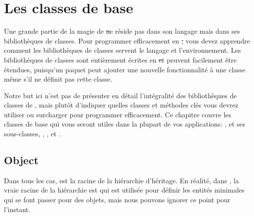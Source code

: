 \documentclass[a4paper,10pt,twoside]{book}
\begin{document}
	\renewcommand{\nnbb}[2]{} %
	\sloppy
\fi
\chapter{Les classes de base}
\label{cha:basic}
Une grande partie de la magie de \st ne r\'eside pas dans son langage mais dans ses biblioth\`eques de classes. Pour programmer efficacement en \st, vous devez apprendre comment les biblioth\`eques de classes servent le langage et l'environnement. Les biblioth\`eques de classes sont enti\`erement \'ecrites en \st et peuvent facilement \^etre \'etendues, puisqu'un paquet peut ajouter une nouvelle fonctionnalit\'e \`a une classe m\^eme s'il ne d\'efinit pas cette classe. 

Notre but ici n'est pas de pr\'esenter en d\'etail l'int\'egralit\'e des biblioth\`eques de classes de \sq, mais plut\^ot d'indiquer quelles classes et m\'ethodes cl\'es vous devrez utiliser ou surcharger pour programmer efficacement. Ce chapitre couvre les classes de base qui vous seront utiles dans la plupart de vos applications: ,  et ses sous-classes, , ,  et .


\section{Object}

Dans tous les cas,  est la racine de la hi\'erarchie d'h\'eritage. En r\'ealit\'e, dans \sq , la vraie racine de la hi\'erarchie est  qui est utilis\'ee pour d\'efinir les entit\'es minimales qui se font passer pour des objets, mais nous pouvons ignorer ce point pour l'instant.
\end{document}
